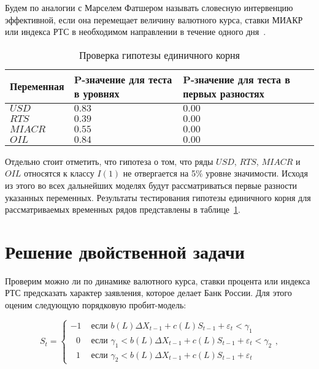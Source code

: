 \documentclass[14pt,a4paper, oneside]{extreport}
\begin{document}
Будем по аналогии с Марселем Фатшером называть словесную интервенцию эффективной, если она перемещает величину валютного курса, ставки МИАКР или индекса РТС в необходимом направлении в течение одного дня~\cite{fratzscher2008communication}.

\begin{table}[h]
	\begin{center}
		\caption{Проверка гипотезы единичного корня}\label{unitroot}
		\begin{tabular}{|m{2.5cm}|m{6cm}|m{6cm}|}
  		\hline
  		Переменная & P-значение для теста в уровнях & P-значение для теста в первых разностях \\ \hline
    	$USD$ & $0.83$ & $0.00$  \\ \hline
  		$RTS$ & $0.39$ & $0.00$ \\ \hline
  		$MIACR$ & $0.55$ & $0.00$ \\ \hline
  		$OIL$ & $0.84$ & $0.00$ \\ \hline
		\end{tabular}
	\end{center}
\end{table}


Отдельно стоит отметить, что гипотеза о том, что ряды $USD$, $RTS$, $MIACR$ и $OIL$ относятся к классу $I(1)$ не отвергается на 5\% уровне значимости. Исходя из этого во всех дальнейших моделях будут рассматриваться первые разности указанных переменных. Результаты тестирования гипотезы единичного корня для рассматриваемых временных рядов представлены в таблице~\ref{unitroot}.


\section{Решение двойственной задачи}

Проверим можно ли по динамике валютного курса, ставки процента или индекса РТС предсказать характер заявления, которое делает Банк России. Для этого оценим следующую порядковую пробит-модель:

\begin{equation}
S_t = \begin{cases} -1 &\text{ если } b(L) \Delta X_{t-1} + c(L) S_{t-1} + \varepsilon_t < \gamma_1 \\
\mbox{ }0 &\text{ если } \gamma_1 < b(L) \Delta X_{t-1} + c(L) S_{t-1} + \varepsilon_t < \gamma_2 \\
\mbox{ }1 &\text{ если } \gamma_2 < b(L) \Delta X_{t-1} + c(L) S_{t-1} + \varepsilon_t 
\end{cases}, 
\end{equation}
\end{document}

